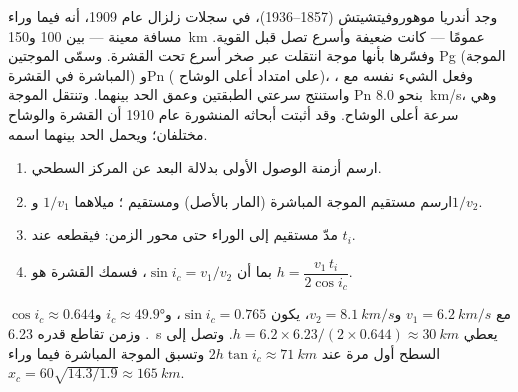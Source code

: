 \begin{history}
وجد أندريا موهوروفيتشيتش (1857--1936)، في سجلات زلزال
عام 1909، أنه فيما وراء مسافة معينة --- بين 100 و\qty{150}{km}
عمومًا --- كانت  ضعيفة وأسرع تصل قبل  القوية.
وفسّرها بأنها موجة انتقلت عبر صخر أسرع تحت
القشرة. وسمّى الموجتين Pg (الموجة المباشرة في القشرة) وPn ( على امتداد أعلى الوشاح)، وفعل الشيء نفسه مع ،
واستنتج سرعتي الطبقتين وعمق الحد بينهما.
وتنتقل الموجة Pn بنحو \qty{8.0}{km/s}، وهي سرعة أعلى
الوشاح. وقد أثبتت أبحاثه المنشورة عام 1910 أن القشرة والوشاح
مختلفان؛ ويحمل الحد بينهما اسمه.
\end{history}

\begin{method}\label{met:g11:seismic-structure:moho}
\begin{enumerate}
  \item ارسم أزمنة الوصول الأولى بدلالة البعد عن
        المركز السطحي.
  \item ارسم مستقيم الموجة المباشرة (المار بالأصل) ومستقيم
        ؛ ميلاهما $1/v_1$ و$1/v_2$.
  \item مدّ مستقيم  إلى الوراء حتى محور الزمن: فيقطعه عند
         $t_i$.
  \item بما أن $\sin i_c = v_1/v_2$، فسمك القشرة هو
        $h = \dfrac{v_1\,t_i}{2\cos i_c}$.
\end{enumerate}
\end{method}

\begin{example}\label{ex:g11:seismic-structure:moho}
مع $v_1 = \qty{6.2}{km/s}$ و$v_2 = \qty{8.1}{km/s}$، يكون $\sin i_c = 0.765$،
و$i_c \approx \ang{49.9}$ و$\cos i_c \approx 0.644$. وزمن تقاطع قدره
\qty{6.23}{s} يعطي $h = 6.2 \times 6.23/(2 \times 0.644) \approx
\qty{30}{km}$. وتصل  إلى السطح أول مرة عند
$2h\tan i_c \approx \qty{71}{km}$ وتسبق الموجة المباشرة فيما وراء
$x_c = 60\sqrt{14.3/1.9} \approx \qty{165}{km}$.
\end{example}

